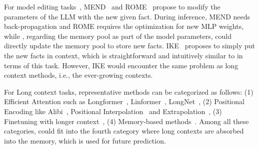 For model editing tasks~\citep{LLMEditing}, MEND~\citep{mend} and ROME~\citep{ROME} propose to modify the parameters of the LLM with the new given fact. During inference, MEND needs back-propagation and ROME requires the optimization for new MLP weights, while \ours, regarding the memory pool as part of the model parameters, could directly update the memory pool to store new facts. IKE~\citep{ike} proposes to simply put the new facts in context, which is straightforward and intuitively similar to \ours in terms of this task. However, IKE would encounter the same problem as long context methods, i.e., the ever-growing contexts. 

For Long context tasks, representative methods can be categorized as follows: (1) Efficient Attention such as Longformer~\citep{longformer}, Linformer~\citep{linformer}, LongNet~\citep{longnet}, (2) Positional Encoding like Alibi~\citep{alibi}, Positional Interpolation~\citep{PositionalInterpolation} and Extrapolation~\citep{lextransformer}, (3) Finetuning with longer context~\citep{Llama2Long, fot}, (4) Memory-based methods~\citep{LongMEM, RMT, Memformer}. Among all these categories, \ours could fit into the fourth category where long contexts are absorbed into the memory, which is used for future prediction. 


